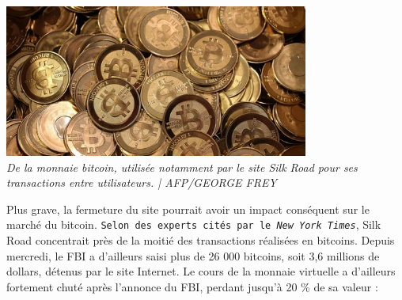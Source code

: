\documentclass[11pt,twoside,a4paper]{article}
\begin{document}
\begin{minipage}[ht]{10.25cm}
	\includegraphics[width=10.00cm]{img/3489417_3_e452_de-la-monnaie-bitcoin-utilisee-notamment-par_c1731595dcf6cff3fe3dabaec5cd41f8.jpg} ~\\
	\emph{De la monnaie bitcoin, utilis{\'e}e notamment par le site Silk Road pour ses transactions entre utilisateurs. | AFP/GEORGE FREY}~\\
\end{minipage} \hfill \begin{minipage}[ht]{9.00cm}
	Plus grave, la fermeture du site pourrait avoir un impact cons{\'e}quent sur le march{\'e} du bitcoin. \texttt{Selon des experts cit{\'e}s par le \emph{New York Times}\footnotemark}, Silk Road concentrait pr{\`e}s de la moiti{\'e} des transactions r{\'e}alis{\'e}es en bitcoins. Depuis mercredi, le FBI a d'ailleurs saisi plus de 26 000 bitcoins, soit 3,6 millions de dollars, d{\'e}tenus par le site Internet. Le cours de la monnaie virtuelle a d'ailleurs fortement chut{\'e} apr{\`e}s l'annonce du FBI, perdant jusqu'{\`a} 20 \% de sa valeur : ~\\
\end{minipage} ~\\
\end{document}
